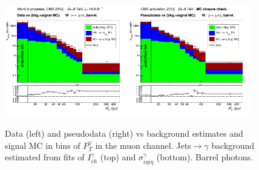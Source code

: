 \begin{figure}[htb]
\begin{center}
   \includegraphics[width=0.48\textwidth]{../figs/figs_v11/MUON_WGamma/PrepareYields/c_DATAvsBkgPlusSigMCc_MUON_WGamma_TEMPL_SIHIH_UNblind__Barrel__phoEt.png}\includegraphics[width=0.48\textwidth]{../figs/figs_v11/MUON_WGamma/PrepareYields/c_DATAvsBkgPlusSigMCc_MUON_WGamma_TEMPL_SIHIH_UNblind_MCclosure__Barrel__phoEt_MCclosure.png}
  \caption{Data (left) and pseudodata (right) vs background estimates and signal MC in bins of $P_T^{\gamma}$ in the muon channel. Jets$\rightarrow\gamma$ background estimated from fits of $I_{ch}^{\gamma}$ (top) and  $\sigma_{i\eta i\eta}^{\gamma}$ (bottom). Barrel photons.}
  \label{fig:DATAvsBKGandSIGMC_MCclosure_MUON_B}
  \end{center}
\end{figure}

